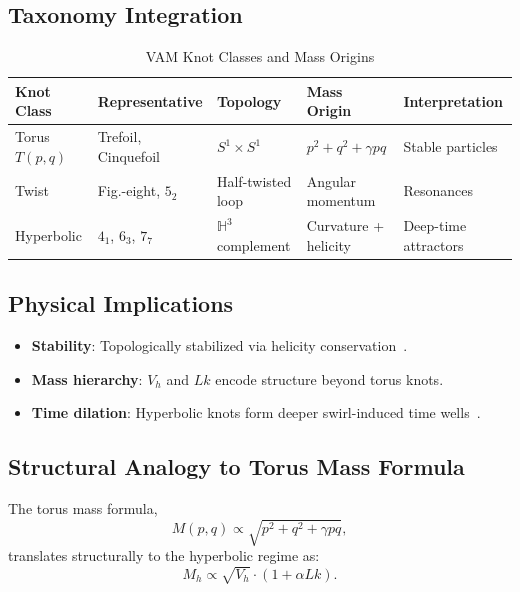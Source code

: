         \subsection{Taxonomy Integration}

        \begin{table}[h]
        \centering
        \caption{VAM Knot Classes and Mass Origins}
        \begin{tabular}{|l|l|l|l|l|}
        \hline
        \textbf{Knot Class} & \textbf{Representative} & \textbf{Topology} & \textbf{Mass Origin} & \textbf{Interpretation} \\
        \hline
        Torus $T(p,q)$ & Trefoil, Cinquefoil & $S^1 \times S^1$ & $p^2 + q^2 + \gamma pq$ & Stable particles \\
        Twist & Fig.-eight, $5_2$ & Half-twisted loop & Angular momentum & Resonances \\
        Hyperbolic & $4_1$, $6_3$, $7_7$ & $\mathbb{H}^3$ complement & Curvature + helicity & Deep-time attractors \\
        \hline
        \end{tabular}
        \end{table}

        \subsection{Physical Implications}

        \begin{itemize}
            \item \textbf{Stability}: Topologically stabilized via helicity conservation~\cite{moffatt2014helicity}.
            \item \textbf{Mass hierarchy}: $V_h$ and $Lk$ encode structure beyond torus knots.
            \item \textbf{Time dilation}: Hyperbolic knots form deeper swirl-induced time wells~\cite{gibbons2002maximal}.
        \end{itemize}

        \subsection{Structural Analogy to Torus Mass Formula}

        The torus mass formula,
        \begin{equation}
            M(p,q) \propto \sqrt{p^2 + q^2 + \gamma pq},
        \end{equation}
        translates structurally to the hyperbolic regime as:
        \begin{equation}
            M_h \propto \sqrt{V_h} \cdot (1 + \alpha Lk).
        \end{equation}

